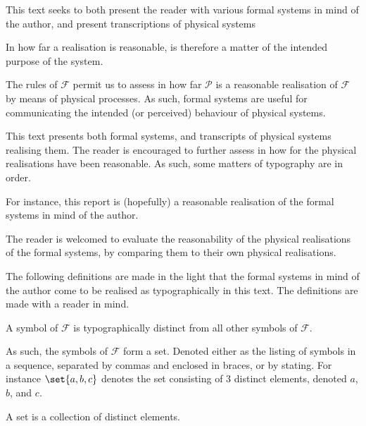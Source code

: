 This text seeks to both present the reader with various formal systems in mind of the author, and present transcriptions of physical systems 



In how
far a realisation is reasonable, is therefore a matter of the intended purpose
of the system.

The rules of $\mathcal{F}$ permit us to assess in how far $\mathcal{P}$ is a
reasonable realisation of $\mathcal{F}$ by means of physical processes.  As
such, formal systems are useful for communicating the intended (or perceived)
behaviour of physical systems.

This text presents both formal systems, and transcripts of physical systems
realising them. The reader is encouraged to further assess in how for the
physical realisations have been reasonable. As such, some matters of
typography are in order.



For instance, this report is
(hopefully) a reasonable realisation of the formal systems in mind of the
author.

The reader is welcomed to evaluate the reasonability of the physical
realisations of the formal systems, by comparing them to their own physical
realisations.


The following definitions are made in the light that the formal systems in mind
of the author come to be realised as typographically in this text. The
definitions are made with a reader in mind.

\begin{definition}

A symbol of $\mathcal{F}$ is typographically distinct from all other symbols of
$\mathcal{F}$.

\end{definition}

As such, the symbols of $\mathcal{F}$ form a set. Denoted either as the listing
of symbols in a sequence, separated by commas and enclosed in braces, or by stating. For
instance $\set{a,b,c}$ denotes the set consisting of 3 distinct elements,
denoted $a$, $b$, and $c$.

\begin{definition}

A set is a collection of distinct elements.

\end{definition}

